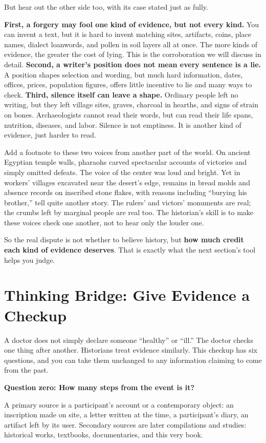 But hear out the other side too, with its case stated just as fully.

\textbf{First, a forgery may fool one kind of evidence, but not every kind.} You can invent a text, but it is hard to invent matching sites, artifacts, coins, place names, dialect loanwords, and pollen in soil layers all at once. The more kinds of evidence, the greater the cost of lying. This is the corroboration we will discuss in detail. \textbf{Second, a writer's position does not mean every sentence is a lie.} A position shapes selection and wording, but much hard information, dates, offices, prices, population figures, offers little incentive to lie and many ways to check. \textbf{Third, silence itself can leave a shape.} Ordinary people left no writing, but they left village sites, graves, charcoal in hearths, and signs of strain on bones. Archaeologists cannot read their words, but can read their life spans, nutrition, diseases, and labor. Silence is not emptiness. It is another kind of evidence, just harder to read.

Add a footnote to these two voices from another part of the world. On ancient Egyptian temple walls, pharaohs carved spectacular accounts of victories and simply omitted defeats. The voice of the center was loud and bright. Yet in workers' villages excavated near the desert's edge, remains in bread molds and absence records on inscribed stone flakes, with reasons including ``burying his brother,'' tell quite another story. The rulers' and victors' monuments are real; the crumbs left by marginal people are real too. The historian's skill is to make these voices check one another, not to hear only the louder one.

So the real dispute is not whether to believe history, but \textbf{how much credit each kind of evidence deserves}. That is exactly what the next section's tool helps you judge.

\section{Thinking Bridge: Give Evidence a Checkup}
A doctor does not simply declare someone ``healthy'' or ``ill.'' The doctor checks one thing after another. Historians treat evidence similarly. This checkup has six questions, and you can take them unchanged to any information claiming to come from the past.

\textbf{Question zero: How many steps from the event is it?}

A primary source is a participant's account or a contemporary object: an inscription made on site, a letter written at the time, a participant's diary, an artifact left by its user. Secondary sources are later compilations and studies: historical works, textbooks, documentaries, and this very book.

